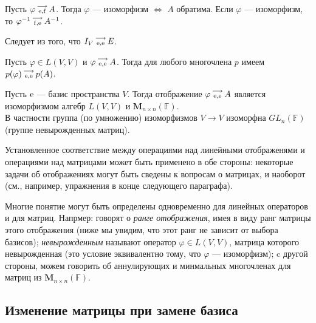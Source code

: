 \begin{sled1}
Пусть $\varphi \begin{smallmatrix} \longrightarrow \\ \mathrm{e}, \mathrm{f} \end{smallmatrix} A$.
Тогда $\varphi$ --- изоморфизм $\Leftrightarrow$ $A$ обратима.
Если $\varphi$ --- изоморфизм, то
$\varphi ^{-1} \begin{smallmatrix} \longrightarrow \\ \mathrm{f}, \mathrm{e} \end{smallmatrix} A^{-1}$.
\end{sled1}
\dok Следует из того, что $I_V \begin{smallmatrix} \longrightarrow \\ \mathrm{e}, \mathrm{e} \end{smallmatrix} E$.
\edok

\begin{sled2}
Пусть $\varphi \in L(V, V)$ и $\varphi \begin{smallmatrix} \longrightarrow \\ \mathrm{e}, \mathrm{e} \end{smallmatrix} A$.
Тогда  для любого многочлена $p$ имеем $p(\varphi) \begin{smallmatrix} \longrightarrow \\ \mathrm{e}, \mathrm{e} \end{smallmatrix} p(A)$.
\end{sled2}

\begin{sled3}
Пусть $\mathrm{e}$ --- базис  пространства $V$.
Тогда отображение $\varphi \begin{smallmatrix} \longrightarrow \\ \mathrm{e}, \mathrm{e} \end{smallmatrix} A$ является изоморфизмом 
алгебр $L(V, V)$ и $\mathbf{M}_{n\times n} (\mathbb{F})$.\\
В частности группа %
(по умножению) изоморфизмов $V\to V$ изоморфна $GL_n(\mathbb{F})$ (группе невырожденных матриц).
\end{sled3}

\otstup

Установленное соответствие между операциями над линейными отображенями и операциями над матрицами
может быть применено в обе стороны: некоторые задачи об отображениях могут быть сведены к вопросам о матрицах, и наоборот (см., например, упражнения в конце следующего параграфа).

Многие понятие могут быть определены одновременно для линейных операторов и для матриц.
Напрмер: говорят о {\it ранге отображения}, имея в виду ранг матрицы этого отображения
(ниже мы увидим, что этот ранг не зависит от выбора базисов);
{\it невырожденным} называют оператор
$\varphi \in L(V, V)$, матрица которого невырожденная (это условие эквивалентно тому, что $\varphi$ --- изоморфизм);
c другой стороны, 
 можем говорить об аннулирующих и минмальных многочленах для матриц из $\mathbf{M}_{n\times n} (\mathbb{F})$.




\subsection{Изменение матрицы при замене базиса}

